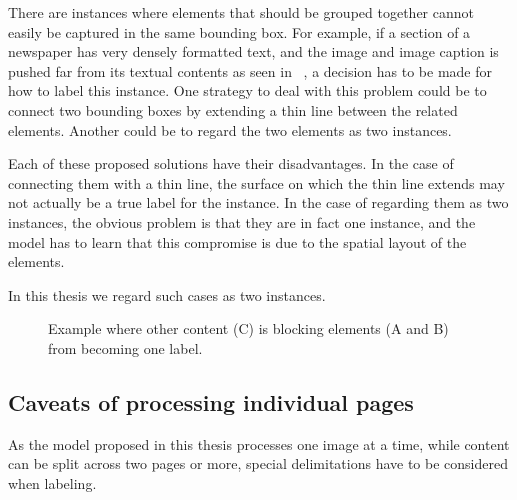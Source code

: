 \documentclass[oneside, english, bibtex]{kththesis}
\begin{document}
There are instances where elements that should be grouped together cannot easily be captured in the same bounding box.
For example, if a section of a newspaper has very densely formatted text, and the image and image caption is pushed far from its textual contents as seen in ~, a decision has to be made for how to label this instance.
One strategy to deal with this problem could be to connect two bounding boxes by extending a thin line between the related elements. Another could be to regard the two elements as two instances.

Each of these proposed solutions have their disadvantages. In the case of connecting them with a thin line, the surface on which the thin line extends may not actually be a true label for the instance.
In the case of regarding them as two instances, the obvious problem is that they are in fact one instance, and the model has to learn that this compromise is due to the spatial layout of the elements.

In this thesis we regard such cases as two instances.

\begin{figure}[H]
\caption{Example where other content (C) is blocking elements (A and B) from becoming one label.}
\label{fig:blockingelements}%
\end{figure}

\subsection{Caveats of processing individual pages}
\label{subs:caveatsindividualpages}

As the model proposed in this thesis processes one image at a time, while content can be split across two pages or more, special delimitations have to be considered when labeling.
\end{document}
